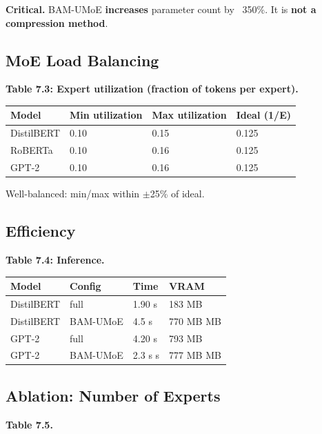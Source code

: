 \textbf{Critical.} BAM-UMoE \textbf{increases} parameter count by ~350\%. 
It is \textbf{not a compression method}.

\subsection{MoE Load Balancing}

\textbf{Table 7.3: Expert utilization (fraction of tokens per expert).}

\begin{table}[H]
\centering
\small
\begin{tabular}{llll}
\toprule
\textbf{Model} & \textbf{Min utilization} & \textbf{Max utilization} & \textbf{Ideal (1/E)} \\
\midrule
DistilBERT & 0.10 & 0.15 & 0.125 \\
RoBERTa & 0.10 & 0.16 & 0.125 \\
GPT-2 & 0.10 & 0.16 & 0.125 \\
\bottomrule
\end{tabular}
\end{table}

Well-balanced: min/max within $\pm$25\% of ideal.

\subsection{Efficiency}

\textbf{Table 7.4: Inference.}

\begin{table}[H]
\centering
\small
\begin{tabular}{llll}
\toprule
\textbf{Model} & \textbf{Config} & \textbf{Time} & \textbf{VRAM} \\
\midrule
DistilBERT & full & 1.90 s & 183 MB \\
DistilBERT & BAM-UMoE & 4.5 s & 770 MB MB \\
GPT-2 & full & 4.20 s & 793 MB \\
GPT-2 & BAM-UMoE & 2.3 s s & 777 MB MB \\
\bottomrule
\end{tabular}
\end{table}

\subsection{Ablation: Number of Experts}

\textbf{Table 7.5.}

